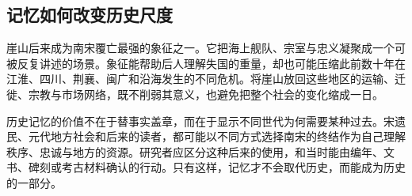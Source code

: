 \subsection{记忆如何改变历史尺度}

崖山后来成为南宋覆亡最强的象征之一。它把海上舰队、宗室与忠义凝聚成一个可被反复讲述的场景。象征能帮助后人理解失国的重量，却也可能压缩此前数十年在江淮、四川、荆襄、闽广和沿海发生的不同危机。将崖山放回这些地区的运输、迁徙、宗教与市场网络，既不削弱其意义，也避免把整个社会的变化缩成一日。

历史记忆的价值不在于替事实盖章，而在于显示不同世代为何需要某种过去。宋遗民、元代地方社会和后来的读者，都可能以不同方式选择南宋的终结作为自己理解秩序、忠诚与地方的资源。研究者应区分这种后来的使用，和当时能由编年、文书、碑刻或考古材料确认的行动。只有这样，记忆才不会取代历史，而能成为历史的一部分。
